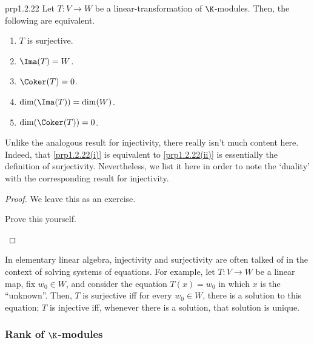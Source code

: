 \begin{prp}{}{prp1.2.22}
	Let $T\colon V\rightarrow W$ be a linear-transformation of $\K$-modules.  Then, the following are equivalent.
	\begin{enumerate}
		\item \label{prp1.2.22(i)}$T$ is surjective.
		\item \label{prp1.2.22(ii)}$\Ima (T)=W$.
		\item \label{prp1.2.22(iii)}$\Coker (T)=0$.
		\item \label{prp1.2.22(iv)}$\dim (\Ima (T))=\dim (W)$.
		\item \label{prp1.2.22(v)}$\dim (\Coker (T))=0$.
	\end{enumerate}
	\begin{rmk}
		Unlike the analogous result for injectivity, there really isn't much content here.  Indeed, that \cref{prp1.2.22(i)} is equivalent to \cref{prp1.2.22(ii)} is essentially the definition of surjectivity.  Nevertheless, we list it here in order to note the `duality' with the corresponding result for injectivity.
	\end{rmk}
	\begin{proof}
		We leave this as an exercise.
		\begin{exr}[breakable=false]{}{}
			Prove this yourself.
		\end{exr}
	\end{proof}
\end{prp}
In elementary linear algebra, injectivity and surjectivity are often talked of in the context of solving systems of equations.  For example, let $T\colon V\rightarrow W$ be a linear map, fix $w_0\in W$, and consider the equation $T(x)=w_0$ in which $x$ is the ``unknown''.  Then, $T$ is surjective iff for every $w_0\in W$, there is a solution to this equation; $T$ is injective iff, whenever there is a solution, that solution is unique.

\subsubsection{Rank of \texorpdfstring{$\K$}{K}-modules}

